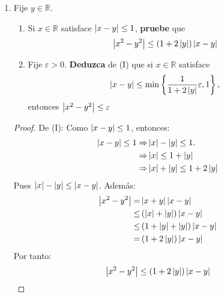 \documentclass[12pt]{article}
\begin{document}
\begin{enumerate}
\begin{proof}
\begin{equation*}
            \max\left\{x,y\right\} = \frac{x+y+\abs{x-y}}{2} \qquad \textup{y} \qquad \min\left\{x,y\right\} = \frac{x+y-\abs{x-y}}{2}
        \end{equation*}
        \qed
    \end{proof}
    \item Fije $y\in\mathbb{R}$.
    \begin{enumerate}
        \item Si $x\in\mathbb{R}$ satisface $\left| x-y \right|\leq 1$, \textbf{pruebe} que
        \begin{equation*}
            \left| x^2-y^2 \right|\leq\left(1+2\left| y \right|\right)\left| x-y \right|
        \end{equation*}
        \item Fije $\varepsilon>0$. \textbf{Deduzca} de (I) que si $x\in\mathbb{R}$ satisface
        \begin{equation*}
            \left| x-y \right|\leq\min\left\{\frac{1}{1+2\left| y \right|}\varepsilon,1\right\},
        \end{equation*}
        entonces $\left| x^2-y^2 \right|\leq\varepsilon$
        \end{enumerate}
    \begin{proof}
        De (I): Como $\left| x-y \right|\leq1$, entonces:
        \begin{equation*}
            \begin{split}
                \left| x-y \right|\leq1\Rightarrow&\left| x \right|-\left| y \right|\leq1.\\
                \Rightarrow&\left| x \right|\leq1+\left| y \right|\\
                \Rightarrow &\left| x \right|+\left| y \right|\leq1+2\left| y \right|
            \end{split}
        \end{equation*}
        Pues $\left| x \right|-\left| y \right|\leq\left| x-y \right|$. Además:
        \begin{equation*}
            \begin{split}
                \left| x^2-y^2 \right|=&\left| x+y \right|\left| x-y \right|\\
                \leq&\left(\left| x \right|+\left| y \right|\right)\left| x-y \right|\\
                \leq&\left(1+\left| y \right|+\left| y \right|\right)\left| x-y \right|\\
                =&\left(1+2\left| y \right|\right)\left| x-y \right|
            \end{split}
        \end{equation*}
        Por tanto:
        \begin{equation*}
            \abs{x^2-y^2}\leq\left(1+2\abs{y}\right)\abs{x-y}

\end{equation*}
\end{proof}
\end{enumerate}
\end{document}
